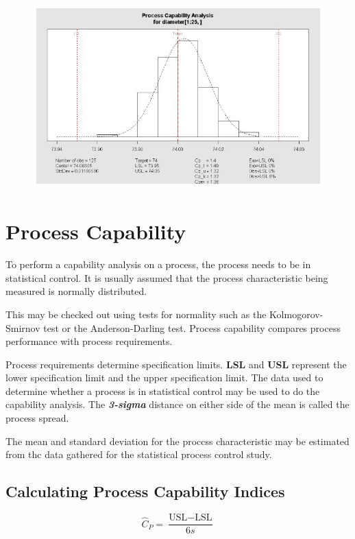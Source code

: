 \documentclass[11pt]{article} %
\begin{document}
			
			\begin{figure}[h!]
\centering
\includegraphics[width=1.1\linewidth]{proccapindices/qcchistogram}
\end{figure}

\section*{Process Capability}

To perform a capability analysis on a process, the process needs to be in statistical control. It is
usually assumed that the process characteristic being measured is normally distributed. 

This may be
checked out using tests for normality such as the Kolmogorov-Smirnov test or the
Anderson-Darling test. Process capability compares process performance with process requirements.

Process requirements determine specification limits. \textbf{LSL} and \textbf{USL} represent the lower specification limit and the upper specification limit.
The data used to determine whether a process is in statistical control may be used to do the
capability analysis. The \textit{\textbf{3-sigma}} distance on either side of the mean is called the process spread. 

The
mean and standard deviation for the proccss characteristic may be estimated from thc data gathered for
the statistical process control study.

\subsection*{Calculating Process Capability Indices}
\[ \hat{C}_P = \frac{\mbox{USL} - \mbox{LSL}}{6s}\]
\end{document}
